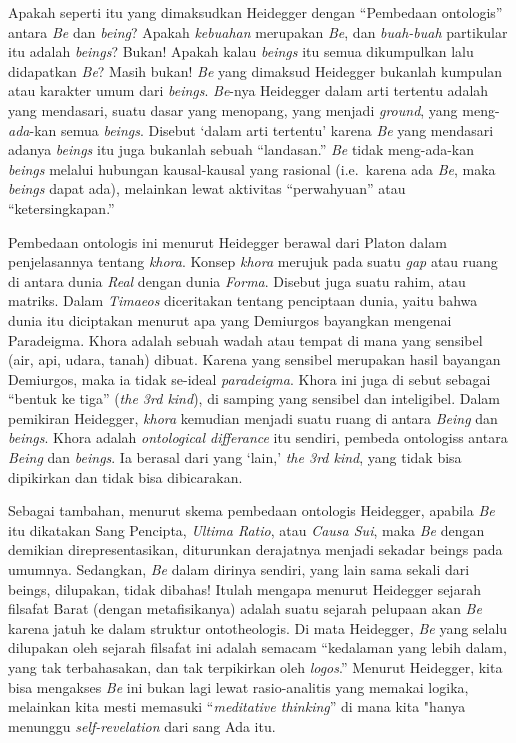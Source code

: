 \documentclass[10pt,a4paper]{article}
\begin{document}
\begin{multicols}{2}
Apakah seperti itu yang dimaksudkan Heidegger dengan ``Pembedaan
ontologis'' antara \emph{Be} dan \emph{being}? Apakah \emph{kebuahan}
merupakan \emph{Be}, dan \emph{buah-buah} partikular itu adalah
\emph{beings}? Bukan! Apakah kalau \emph{beings} itu semua dikumpulkan
lalu didapatkan \emph{Be}? Masih bukan! \emph{Be} yang dimaksud
Heidegger bukanlah kumpulan atau karakter umum dari \emph{beings}.
\emph{Be}-nya Heidegger dalam arti tertentu adalah yang mendasari, suatu
dasar yang menopang, yang menjadi \emph{ground}, yang
meng-\emph{ada}-kan semua \emph{beings}. Disebut `dalam arti tertentu'
karena \emph{Be} yang mendasari adanya \emph{beings} itu juga bukanlah
sebuah ``landasan.'' \emph{Be} tidak meng-ada-kan \emph{beings} melalui
hubungan kausal-kausal yang rasional (i.e.~karena ada \emph{Be}, maka
\emph{beings} dapat ada), melainkan lewat aktivitas ``perwahyuan'' atau
``ketersingkapan.''

Pembedaan ontologis ini menurut Heidegger berawal dari Platon dalam
penjelasannya tentang \emph{khora}. Konsep \emph{khora} merujuk pada
suatu \emph{gap} atau ruang di antara dunia \emph{Real} dengan dunia
\emph{Forma}. Disebut juga suatu rahim, atau matriks. Dalam
\emph{Timaeos} diceritakan tentang penciptaan dunia, yaitu bahwa dunia
itu diciptakan menurut apa yang Demiurgos bayangkan mengenai Paradeigma.
Khora adalah sebuah wadah atau tempat di mana yang sensibel (air, api,
udara, tanah) dibuat. Karena yang sensibel merupakan hasil bayangan
Demiurgos, maka ia tidak se-ideal \emph{paradeigma}. Khora ini juga di
sebut sebagai ``bentuk ke tiga'' (\emph{the 3rd kind}), di samping yang
sensibel dan inteligibel. Dalam pemikiran Heidegger, \emph{khora}
kemudian menjadi suatu ruang di antara \emph{Being} dan \emph{beings}.
Khora adalah \emph{ontological differance} itu sendiri, pembeda
ontologiss antara \emph{Being} dan \emph{beings}. Ia berasal dari yang
`lain,' \emph{the 3rd kind}, yang tidak bisa dipikirkan dan tidak bisa
dibicarakan.

Sebagai tambahan, menurut skema pembedaan ontologis Heidegger, apabila
\emph{Be} itu dikatakan Sang Pencipta, \emph{Ultima Ratio}, atau
\emph{Causa Sui}, maka \emph{Be} dengan demikian direpresentasikan,
diturunkan derajatnya menjadi sekadar beings pada umumnya. Sedangkan,
\emph{Be} dalam dirinya sendiri, yang lain sama sekali dari beings,
dilupakan, tidak dibahas! Itulah mengapa menurut Heidegger sejarah
filsafat Barat (dengan metafisikanya) adalah suatu sejarah pelupaan akan
\emph{Be} karena jatuh ke dalam struktur ontotheologis. Di mata
Heidegger, \emph{Be} yang selalu dilupakan oleh sejarah filsafat ini
adalah semacam ``kedalaman yang lebih dalam, yang tak terbahasakan, dan
tak terpikirkan oleh \emph{logos}.'' Menurut Heidegger, kita bisa
mengakses \emph{Be} ini bukan lagi lewat rasio-analitis yang memakai
logika, melainkan kita mesti memasuki ``\emph{meditative thinking}'' di
mana kita "hanya menunggu \emph{self-revelation} dari sang Ada itu.


\end{multicols}
\end{document}

